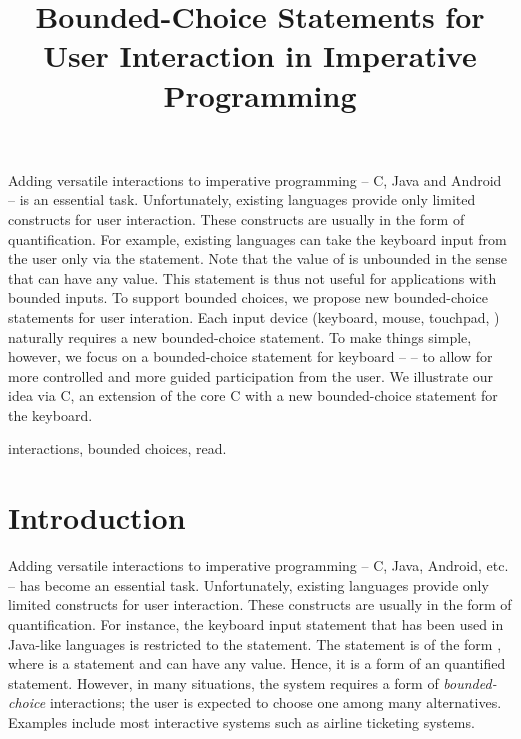 \documentclass[letter]{ieice}
\title{ Bounded-Choice Statements for  User Interaction  in
 Imperative  Programming}
\newcommand{\muprolog}{{C}}
\begin{document}
\maketitle
\begin{summary}
Adding versatile interactions to imperative  programming -- C, Java and
Android -- is an essential
task. 
Unfortunately, existing  languages provide only limited constructs for user interaction.
These constructs are usually in the form of  quantification. For example,
  existing  languages can take the keyboard input from the user only
via the   statement. Note that the value of   is  unbounded
in the sense that  can have any value. This statement is thus not useful for 
applications with bounded
inputs.
  To support bounded choices, we propose new bounded-choice statements for user interation.
Each input device (keyboard,  mouse, touchpad, ) 
naturally requires a new  bounded-choice statement.
To make things simple, however, we focus on a  bounded-choice statement  for keyboard --  --
 to allow for more controlled and more 
guided participation from the user. We illustrate our idea
via \muprolog, an extension of the core C  with a new 
bounded-choice statement for the keyboard.
\end{summary}
\begin{keywords}
interactions,  bounded choices, read.
\end{keywords}








\section{Introduction}\label{sec:intro}

 Adding versatile interactions to imperative  programming -- C, Java,
Android, etc. -- has become an essential
task. 
Unfortunately, existing  languages provide only limited constructs for user interaction.
These constructs are usually in the form of  quantification. For instance, 
the keyboard input statement  that has been used
in Java-like languages  is restricted to the  statement. 
The  statement is  of the form , where  is a statement and 
 can have any value. Hence, it is a form of an  quantified 
statement.  However, in many situations,
the system requires a  form of  
{\it bounded-choice} interactions; the user is expected to choose  one among many alternatives.  Examples include most interactive systems such as airline ticketing systems.
\end{document}
